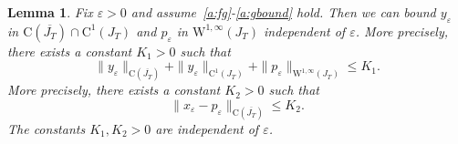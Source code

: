 \documentclass[12pt]{article}
\newtheorem{lem}[thm]{Lemma}
\newcommand{\be}{\begin{equation}}
\newcommand{\ee}{\end{equation}}
\begin{document}
\begin{lem}
\label{lem:boundedness}
Fix $\varepsilon>0$ and assume~\ref{a:fg}-\ref{a:gbound} hold. Then we can bound 
$y_{\varepsilon}$ in $\mathrm{C}(\overline{J_T})\cap\mathrm{C}^1(J_T)$ and $p_{\varepsilon}$ 
in $\mathrm{W}^{1,\infty}(J_T)$ independent of $\varepsilon$. More precisely, there exists
a constant $K_1>0$ such that 
\be
\label{eq:fboundlem1}
\|y_\varepsilon\|_{\mathrm{C}(\overline{J_T})}  + \|y_\varepsilon\|_{\mathrm{C}^1(J_T)} 
+ \|p_\varepsilon\|_{\mathrm{W}^{1,\infty}(J_T)} \leq K_1.
\ee
More precisely, there exists a constant $K_2>0$ such that
\be
	\|x_\varepsilon - p_\varepsilon\|_{\mathrm{C}(\overline{J_T})} 
	\leq K_2.\label{Eq:estim_dist_y_eps_p_eps}
\ee
The constants $K_1, K_2>0$ are	independent of $\varepsilon$.	
\end{lem}
\end{document}
